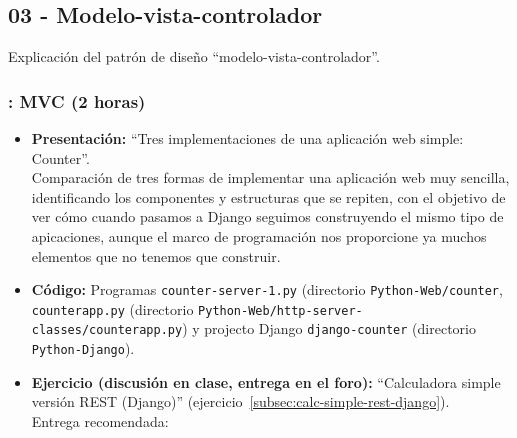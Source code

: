 \documentclass[a4paper,12pt]{article}
\begin{document}


\subsection{03 - Modelo-vista-controlador}

Explicación del patrón de diseño ``modelo-vista-controlador''.

\subsubsection{\martesG: MVC (2 horas)}
\label{cal:martesG}

\begin{itemize}
\item \textbf{Presentación:} ``Tres implementaciones de una aplicación web simple: Counter''. \\
  Comparación de tres formas de implementar una aplicación web muy sencilla, identificando los componentes y estructuras que se repiten, con el objetivo de ver cómo cuando pasamos a Django seguimos construyendo el mismo tipo de apicaciones, aunque el marco de programación nos proporcione ya muchos elementos que no tenemos que construir.
\item \textbf{Código:} Programas \verb|counter-server-1.py| (directorio \verb|Python-Web/counter|, \verb|counterapp.py| (directorio \verb|Python-Web/http-server-classes/counterapp.py|) y projecto Django \verb|django-counter| (directorio \verb|Python-Django|).
\item \textbf{Ejercicio (discusión en clase, entrega en el foro):} ``Calculadora simple versión REST (Django)'' (ejercicio~\ref{subsec:calc-simple-rest-django}). \\
%
Entrega recomendada: \martesI

\end{itemize}
\end{document}

